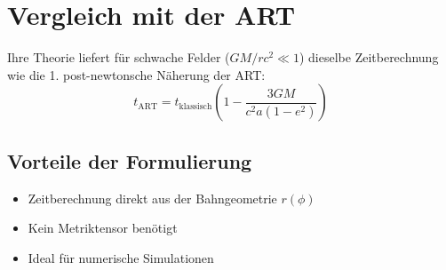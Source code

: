 \section{Vergleich mit der ART}
Ihre Theorie liefert für schwache Felder ($GM/rc^2 \ll 1$) dieselbe Zeitberechnung wie die 1. post-newtonsche Näherung der ART:
\[
t_{\text{ART}} = t_{\text{klassisch}} \left(1 - \frac{3GM}{c^2 a(1-e^2)}\right)
\]

\subsection{Vorteile der Formulierung}
\begin{itemize}
\item Zeitberechnung direkt aus der Bahngeometrie $r(\phi)$
\item Kein Metriktensor benötigt
\item Ideal für numerische Simulationen
\end{itemize}